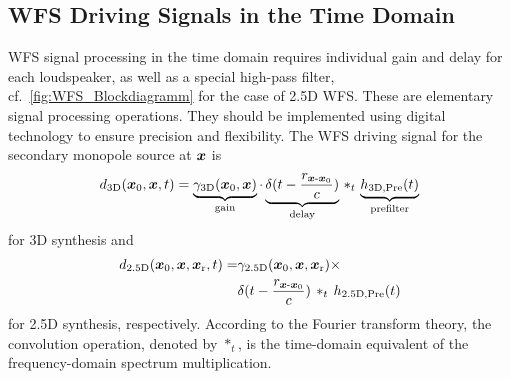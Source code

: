 \subsection{WFS Driving Signals in the Time Domain}
\label{sec:WFS_Ansteuerung_im_Zeitbereich}

WFS signal processing in the time domain requires individual gain and
delay for each loudspeaker, as well as a special high-pass filter,
cf.~\myfig\ref{fig:WFS_Blockdiagramm} for the case of 2.5D WFS.
%
These are elementary signal processing operations.
%
They should be implemented using digital technology to ensure
precision and flexibility.
%
The WFS driving signal
for the secondary monopole source at $\bm{x}$ is
\begin{align}
d_\text{3D}(\bm{x}_\mathrm{0},\bm{x}, t) =
\underbrace{\gamma_\text{3D}(\bm{x}_\mathrm{0},\bm{x})}_{\text{gain}} \cdot
\underbrace{\delta(t-\frac{r_{\bm{x}\text{-}\bm{x}_\mathrm{0}}}{c})}_{\text{delay}} \,\ast_t\,
\underbrace{h_\text{3D,Pre}(t)}_{\text{prefilter}}
\end{align}
for 3D synthesis
and
\begin{align}
d_\text{2.5D}(\bm{x}_\mathrm{0},\bm{x},\bm{x}_\mathrm{r}, t) =
&\gamma_\text{2.5D}(\bm{x}_\mathrm{0},\bm{x},\bm{x}_\mathrm{r}) \times\nonumber\\
&\delta(t-\frac{r_{\bm{x}\text{-}\bm{x}_\mathrm{0}}}{c}) \,\ast_t\,
h_\text{2.5D,Pre}(t)
\label{eq:h25d_time}
\end{align}
for 2.5D synthesis, respectively.
%
According to the Fourier transform theory, the convolution operation,
denoted by $\ast_t$, is the time-domain equivalent of the frequency-domain
spectrum multiplication.



